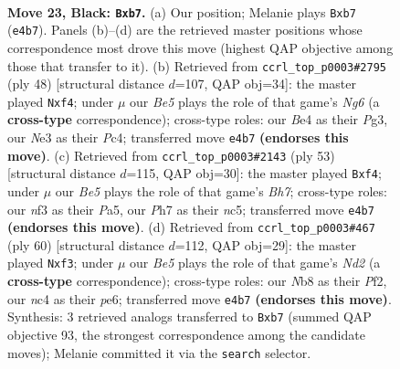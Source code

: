 \documentclass[11pt]{article}
\begin{document}
\clearpage

\begin{figure}[p]\centering
\begin{subfigure}{0.46\textwidth}\centering
\resizebox{\linewidth}{!}{%
\newchessgame
\chessboard[
  setfen={rn4k1/pQ3ppp/4p3/8/2N1b2P/4nN2/PP4R1/R1K5 b - - 0 23},
  showmover=false,
  pgfstyle=straightmove, color=movearrow, markmove={e4-b7}
]}
\caption{}
\end{subfigure}\hfill
\begin{subfigure}{0.46\textwidth}\centering
\resizebox{\linewidth}{!}{%
\newchessgame
\chessboard[
  setfen={r2nr1k1/1p2p2p/4bpN1/p6P/2P1Bq2/6P1/3RPP2/2R3K1 w - - 0 25},
  showmover=false,
  pgfstyle=straightmove, color=movearrow, markmove={g6-f4}
]}
\caption{}
\end{subfigure}
\\[4pt]
\begin{subfigure}{0.46\textwidth}\centering
\resizebox{\linewidth}{!}{%
\newchessgame
\chessboard[
  setfen={r5k1/5pp1/2p2n1p/p1N5/RPB2Q2/7P/3r1PPb/4R2K b - - 0 27},
  showmover=false,
  pgfstyle=straightmove, color=movearrow, markmove={h2-f4}
]}
\caption{}
\end{subfigure}\hfill
\begin{subfigure}{0.46\textwidth}\centering
\resizebox{\linewidth}{!}{%
\newchessgame
\chessboard[
  setfen={R4nk1/6pp/3rp3/2p2p2/2P5/1P3qP1/3N1P1P/6K1 w - - 0 31},
  showmover=false,
  pgfstyle=straightmove, color=movearrow, markmove={d2-f3}
]}
\caption{}
\end{subfigure}
\caption{\textbf{Move 23, Black: \texttt{Bxb7}.} (a) Our position; Melanie plays \texttt{Bxb7} (\texttt{e4b7}). Panels (b)--(d) are the retrieved master positions whose correspondence most drove this move (highest QAP objective among those that transfer to it). (b) Retrieved from \texttt{ccrl\_top\_p0003\#2795} (ply 48) [structural distance $d$=107, QAP obj=34]: the master played \texttt{Nxf4}; under $\mu$ our \emph{Be5} plays the role of that game's \emph{Ng6} (a \textbf{cross-type} correspondence); cross-type roles: our \emph{B}e4 as their \emph{P}g3, our \emph{N}e3 as their \emph{P}c4; transferred move \texttt{e4b7} \textbf{(endorses this move)}. (c) Retrieved from \texttt{ccrl\_top\_p0003\#2143} (ply 53) [structural distance $d$=115, QAP obj=30]: the master played \texttt{Bxf4}; under $\mu$ our \emph{Be5} plays the role of that game's \emph{Bh7}; cross-type roles: our \emph{n}f3 as their \emph{P}a5, our \emph{P}h7 as their \emph{n}c5; transferred move \texttt{e4b7} \textbf{(endorses this move)}. (d) Retrieved from \texttt{ccrl\_top\_p0003\#467} (ply 60) [structural distance $d$=112, QAP obj=29]: the master played \texttt{Nxf3}; under $\mu$ our \emph{Be5} plays the role of that game's \emph{Nd2} (a \textbf{cross-type} correspondence); cross-type roles: our \emph{N}b8 as their \emph{P}f2, our \emph{n}c4 as their \emph{p}e6; transferred move \texttt{e4b7} \textbf{(endorses this move)}. Synthesis: 3 retrieved analogs transferred to \texttt{Bxb7} (summed QAP objective 93, the strongest correspondence among the candidate moves); Melanie committed it via the \texttt{search} selector.}
\label{fig:thought-m45}
\end{figure}
\end{document}
